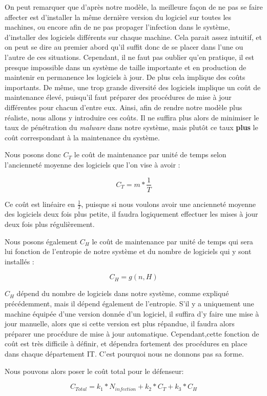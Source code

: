 On peut remarquer que d'après notre modèle, la meilleure façon de ne pas se faire affecter est d'installer la même dernière version du logiciel sur toutes les machines, ou encore afin de ne pas propager l'infection dans le système, d'installer des logiciels différents sur chaque machine. Cela parait assez intuitif, et on peut se dire au premier abord qu'il suffit donc de se placer dans l'une ou l'autre de ces situations. Cependant, il ne faut pas oublier qu'en pratique, il est presque impossible dans un système de taille importante et en production de maintenir en permanence les logiciels à jour. De plus cela implique des coûts importants. De même, une trop grande diversité des logiciels implique un coût de maintenance élevé, puisqu'il faut préparer des procédures de mise à jour différentes pour chacun d'entre eux.
Ainsi, afin de rendre notre modèle plus réaliste, nous allons y introduire ces coûts. Il ne suffira plus alors de minimiser le taux de pénétration du \textit{malware} dans notre système, mais plutôt ce taux \textbf{plus} le coût correspondant à la maintenance du système.

Nous posons donc $C_T$ le coût de maintenance par unité de temps selon l'ancienneté moyenne des logiciels que l'on vise à avoir :

\[
C_T=m*\frac{1}{T}
\]

Ce coût est linéaire en $\frac{1}{T}$, puisque si nous voulons avoir une ancienneté moyenne des logiciels deux fois plus petite, il faudra logiquement effectuer les mises à jour deux fois plus régulièrement.

Nous posons également $C_H$ le coût de maintenance par unité de temps qui sera lui fonction de l'entropie de notre système et du nombre de logiciels qui y sont installés :

\[
C_H = g(n,H)
\]

$C_H$ dépend du nombre de logiciels dans notre système, comme expliqué précédemment, mais il dépend également de l'entropie. S'il y a uniquement une machine équipée d'une version donnée d'un logiciel, il suffira d'y faire une mise à jour manuelle, alors que si cette version est plus répandue, il faudra alors préparer une procédure de mise à jour automatique. Cependant,cette fonction de coût est très difficile à définir, et dépendra fortement des procédures en place dans chaque département IT. C'est pourquoi nous ne donnons pas sa forme.

Nous pouvons alors poser le coût total pour le défenseur:

\[
C_{Total}=k_1*N_{infection}+k_2*C_T+k_3*C_H
\]

